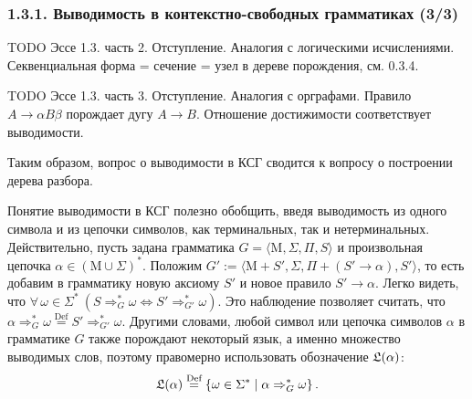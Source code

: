 \documentclass[mathserif,12pt,aspectratio=169]{beamer}
\def\Set#1#2{\left\{ #1 \mid #2 \right\}}
\let\Equiv\Longleftrightarrow
\def\Assign{\operatorname{:=}}
\def\Def{\stackrel{\text{Def}}{=}}
\def\A#1#2{\forall\,#1\ \left(#2\right)}
\def\TODO#1{{\color{gray} TODO {#1}}}
\begin{document}
\begin{frame}
\frametitle{1.3.1. Выводимость в контекстно-свободных грамматиках (3/3)}
\TODO{Эссе 1.3. часть 2. Отступление. Аналогия с логическими исчислениями. 
\\Секвенциальная форма = сечение = узел в дереве порождения, см. 0.3.4. 
}

\TODO{Эссе 1.3. часть 3. Отступление. Аналогия с орграфами.  Правило $A\to \alpha B \beta$ порождает дугу $A\to B$. Отношение достижимости соответствует выводимости. }

Таким образом, вопрос о выводимости в КСГ
сводится к вопросу о построении дерева разбора. 

\medskip 
Понятие выводимости в КСГ полезно обобщить, введя выводимость     
из одного символа и из цепочки символов, как терминальных, так и нетерминальных.
Действительно, пусть
задана грамматика $G=\langle \mathrm{M}, \Sigma, \Pi, S \rangle$ и
произвольная цепочка $\alpha \in (\mathrm{M}\cup\Sigma)^*$.
Положим $G' \Assign \langle \mathrm{M}+S', \Sigma, \Pi+(S'\to\alpha), S' \rangle$,
то есть добавим в грамматику новую аксиому $S'$
и новое правило $S' \to\alpha$. Легко видеть, что
$\A{\omega\in\Sigma^*}{S\Rightarrow^*_G \omega \Equiv S'\Rightarrow^*_{G'} \omega}$. 
Это наблюдение позволяет считать, что
$ \alpha\Rightarrow^*_G \omega \Def S'\Rightarrow^*_{G'} \omega$.
Другими словами, любой символ или 
цепочка символов $\alpha$ в грамматике $G$ также порождают некоторый язык, а именно множество выводимых слов, поэтому правомерно использовать обозначение
$\frak{L}(\alpha)$:
$$\frak{L}(\alpha)\Def\Set{\omega\in\Sigma^*}{\alpha\Rightarrow^*_G \omega}.$$
       
\end{frame}
\end{document}
